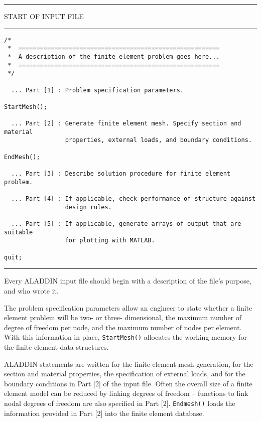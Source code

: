 \vspace{0.25 in}
\begin{footnotesize}
\noindent
{\rule{2.3 in}{0.035 in} START OF INPUT FILE \rule{2.3 in}{0.035 in} }
\begin{verbatim}
/*
 *  ========================================================
 *  A description of the finite element problem goes here...
 *  ========================================================
 */

  ... Part [1] : Problem specification parameters.

StartMesh();

  ... Part [2] : Generate finite element mesh. Specify section and material
                 properties, external loads, and boundary conditions.

EndMesh();

  ... Part [3] : Describe solution procedure for finite element problem.

  ... Part [4] : If applicable, check performance of structure against
                 design rules.

  ... Part [5] : If applicable, generate arrays of output that are suitable
                 for plotting with MATLAB.

quit;
\end{verbatim}
\rule{6.25 in}{0.035 in}
\end{footnotesize}

\vspace{0.25 in}\noindent
Every ALADDIN input file should begin with a
description of the file's purpose, and who wrote it.

\vspace{0.15 in}
\noindent\hspace{0.5 in}
The problem specification parameters allow an
engineer to state whether a finite element
problem will be two- or three- dimensional,
the maximum number of degree of freedom per node,
and the maximum number of nodes per element.
With this information in place,
{\tt StartMesh()} allocates the working memory for the
finite element data structures.

\vspace{0.15 in}
\noindent\hspace{0.5 in}
ALADDIN statements are written for the finite element mesh generation,
for the section and material properties, the specification of
external loads, and for the boundary conditions in Part [2] of the input file.
Often the overall size of a finite element model can be
reduced by linking degrees of freedom -- functions
to link nodal degrees of freedom are also specified in Part [2].
{\tt Endmesh()} loads the information provided in Part [2]
into the finite element database. 

